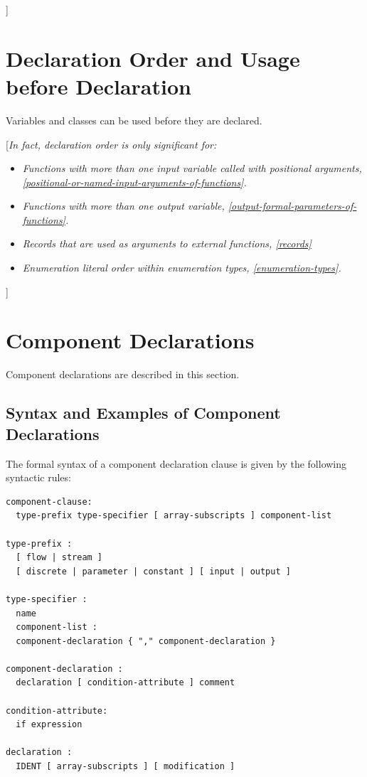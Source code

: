\documentclass[10pt,a4paper]{report}
\def\doublelabel#1{\label{#1}\hypertarget{#1}{}}
\begin{document}
{]}

\section{Declaration Order and Usage before Declaration}\doublelabel{declaration-order-and-usage-before-declaration}

Variables and classes can be used before they are declared.

{[}\emph{In fact, declaration order is only significant for:}

\begin{itemize}
\item
  \emph{Functions with more than one input variable called with
  positional arguments, \ref{positional-or-named-input-arguments-of-functions}.}
\item
  \emph{Functions with more than one output variable, \ref{output-formal-parameters-of-functions}.}
\item
  \emph{Records that are used as arguments to external functions,
  \ref{records}}
\item
  \emph{Enumeration literal order within enumeration types, \ref{enumeration-types}.}
\end{itemize}

{]}

\section{Component Declarations}\doublelabel{component-declarations}

Component declarations are described in this section.

\subsection{Syntax and Examples of Component Declarations}\doublelabel{syntax-and-examples-of-component-declarations}

The formal syntax of a component declaration clause is given by the
following syntactic rules:

\begin{lstlisting}[language=modelica]
component-clause:
  type-prefix type-specifier [ array-subscripts ] component-list
  
type-prefix :
  [ flow | stream ]
  [ discrete | parameter | constant ] [ input | output ]
  
type-specifier :
  name
  component-list :
  component-declaration { "," component-declaration }
  
component-declaration :
  declaration [ condition-attribute ] comment
  
condition-attribute:
  if expression
  
declaration :
  IDENT [ array-subscripts ] [ modification ]
\end{lstlisting}
\end{document}
